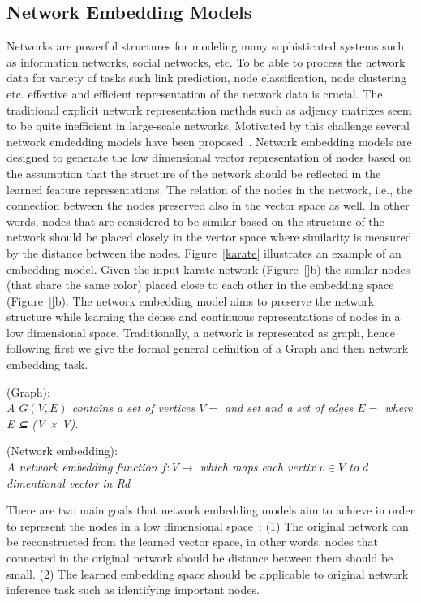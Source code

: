\subsection{Network Embedding Models}
\label{subsec:network_embedding_models}
Networks are powerful structures for modeling many sophisticated systems such as information networks, social networks, etc. To be able to process the network data for variety of tasks such link prediction, node classification, node clustering etc. effective and efficient representation of the network data is crucial. The traditional explicit network representation methds such as adjency matrixes seem to be quite inefficient in large-scale networks. Motivated by this challenge several network emdedding models have been proposed~\cite{}.
Network embedding models are designed to generate the low dimensional vector representation of nodes based on the assumption that the structure of the network should be reflected in the learned feature representations. The relation of the nodes in the network, i.e., the connection between the nodes preserved also in the vector space as well. In other words, nodes that are considered to be similar based on the structure of the network should be placed closely in the vector space where similarity is measured by the distance between the nodes. 
Figure~\ref{karate} illustrates an example of an embedding model. Given the input karate network (Figure~\ref{}b) the similar nodes (that share the same color) placed close to each other in the embedding space (Figure~\ref{}b). The network embedding model aims to preserve the network structure while learning the dense and continuous representations of nodes in a low dimensional space. 
Traditionally, a network is represented as graph, hence following first we give the formal general definition of a Graph and then network embedding task.
\begin{definition}{(Graph):\\}
\textit{A $G(V, E)$ contains a set of vertices $V={}$ and set and a set of edges $E={}$ where E ⊆ (V × V).}
\end{definition}

\begin{definition}{(Network embedding):\\}
\textit{A network embedding function $f : V \rightarrow $ which maps each vertix $v \in V$ to  $d$ dimentional vector in Rd }
\end{definition}

There are two main goals that network embedding models aim to achieve in order to represent the nodes in a low dimensional space~\cite{survey}: (1) The original network can be reconstructed from the learned vector space, in other words, nodes that connected in the original network should be distance between them should be small. (2) The learned embedding space should be applicable to original network inference task such as identifying important nodes.

